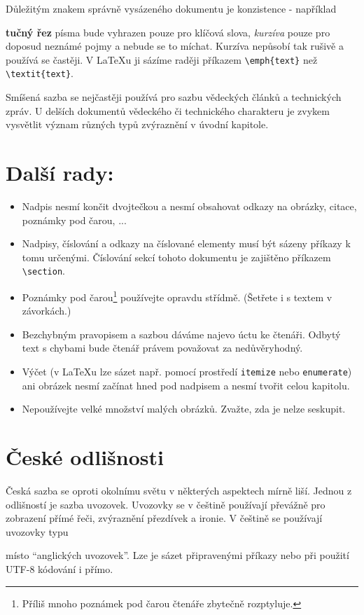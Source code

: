\documentclass[a4paper, 10pt, twocolumn]{article}
\begin{document}
Důležitým znakem správně vysázeného dokumentu je konzistence - například {\textbf{tučný řez} písma bude vyhrazen pouze pro klíčová slova, \emph{kurzíva} pouze pro doposud neznámé pojmy a nebude se to míchat.
Kurzíva nepůsobí tak rušivě a používá se častěji.
V \LaTeX u ji sázíme raději příkazem  \verb|\emph{text}| než \verb|\textit{text}|.

Smíšená sazba se nejčastěji používá pro sazbu vědeckých článků a technických zpráv.
U delších dokumentů vědeckého či technického charakteru je zvykem vysvětlit význam různých typů zvýraznění v úvodní kapitole.

\section{Další rady:}
\begin{itemize}
    \item Nadpis nesmí končit dvojtečkou a nesmí obsahovat odkazy na obrázky, citace, poznámky pod čarou, ...
    \item Nadpisy, číslování a odkazy na číslované elementy musí být sázeny příkazy k tomu určenými. Číslování sekcí tohoto dokumentu je zajištěno příkazem \verb|\section|.
    \item Poznámky pod čarou\footnote{Příliš mnoho poznámek pod čarou čtenáře zbytečně rozptyluje.} používejte opravdu střídmě. (Šetřete i s textem v závorkách.)
    \item Bezchybným pravopisem a sazbou dáváme najevo úctu ke čtenáři. Odbytý text s chybami bude čtenář právem považovat za nedůvěryhodný.
    \item Výčet (v \LaTeX u lze sázet např. pomocí prostředí \verb|itemize| nebo \verb|enumerate|) ani obrázek nesmí začínat hned pod nadpisem a nesmí tvořit celou kapitolu.
    \item Nepoužívejte velké množství malých obrázků. Zvažte, zda je nelze seskupit.
\end{itemize}


\section{České odlišnosti}
Česká sazba se oproti okolnímu světu v některých aspektech mírně liší.
Jednou z odlišností je sazba uvozovek.
Uvozovky se v češtině používají převážně pro zobrazení přímé řeči, zvýraznění přezdívek a ironie.
V češtině se používají uvozovky typu { místo  ``anglických uvozovek''.
Lze je sázet připravenými příkazy nebo při použití UTF-8 kódování i přímo.

}}
\end{document}
